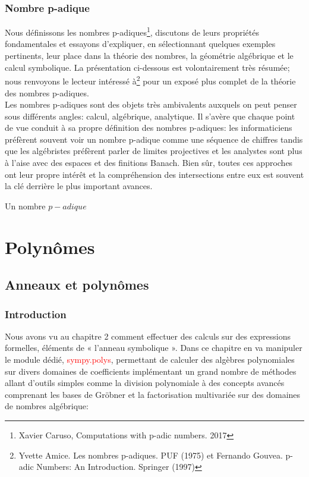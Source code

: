 \subsection{Nombre p-adique}
Nous définissons les nombres p-adiques\footnote{Xavier Caruso, Computations with p-adic numbers. 2017}, discutons de leurs propriétés fondamentales et essayons d'expliquer, en sélectionnant quelques exemples pertinents, leur place dans la théorie des nombres, la géométrie algébrique et le calcul symbolique. La présentation ci-dessous est volontairement très résumée; nous renvoyons le lecteur intéressé à\footnote{Yvette Amice. Les nombres p-adiques. PUF (1975) et Fernando Gouvea. p-adic Numbers: An Introduction. Springer (1997) } pour un exposé plus complet de la théorie des nombres p-adiques.
\\
Les nombres p-adiques sont des objets très ambivalents auxquels on peut penser sous différents angles:
calcul, algébrique, analytique. Il s'avère que chaque point de vue conduit à sa propre définition
des nombres p-adiques: les informaticiens préfèrent souvent voir un nombre p-adique comme une séquence de
chiffres tandis que les algébristes préfèrent parler de limites projectives et les analystes sont plus à l'aise
avec des espaces et des finitions Banach. Bien sûr, toutes ces approches ont leur propre intérêt
et la compréhension des intersections entre eux est souvent la clé derrière le plus important
avances.
\begin{definition}
Un nombre $p-adique$
\end{definition}
\chapter{Polynômes}
 \section{Anneaux et polynômes}
  \subsection{Introduction}
 Nous avons vu au chapitre 2 comment effectuer des calculs sur des expressions formelles, éléments de « l'anneau symbolique ». Dans ce chapitre en va manipuler le module dédié, \textcolor{red}{sympy.polys}, permettant de calculer des algèbres polynomiales sur divers domaines de coefficients implémentant un grand nombre de méthodes  allant d’outils simples comme la division polynomiale à des concepts avancés comprenant les bases de Gröbner et la factorisation multivariée sur des domaines de nombres algébrique:
